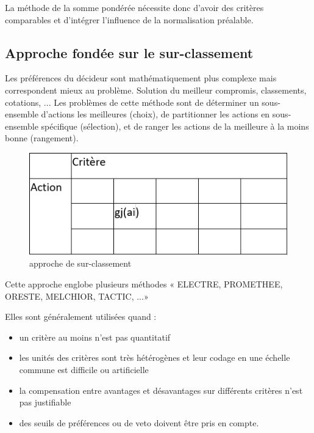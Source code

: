 La méthode de la somme pondérée nécessite donc d'avoir des critères comparables et d'intégrer l'influence de la normalisation préalable.



\subsection{Approche fondée sur le sur-classement}
Les préférences du décideur sont mathématiquement plus complexe mais correspondent mieux au problème. Solution du meilleur compromis, classements, cotations, ... Les problèmes de cette méthode sont de déterminer un sous-ensemble d'actions les meilleures (choix), de partitionner les actions en sous-ensemble spécifique (sélection), et de ranger les actions de la meilleure à la moins bonne (rangement).


\begin{figure}[!h]
\begin{center}
\includegraphics{aide_multicrit_decision/approche_surclassement.png}
\end{center}
\caption{approche de sur-classement}
\end{figure}

Cette approche englobe plusieurs méthodes « ELECTRE, PROMETHEE, ORESTE, MELCHIOR, TACTIC, ...»

Elles sont généralement utilisées quand :

\begin{itemize}
\item un critère au moins n’est pas quantitatif
\item les unités des critères sont très hétérogènes et leur codage en une échelle commune est difficile ou artificielle
\item la compensation entre avantages et désavantages sur différents critères n’est pas justifiable
\item des seuils de préférences ou de veto doivent être pris en compte.
\end{itemize}

